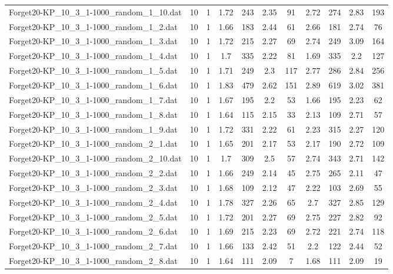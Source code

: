 \begin{table}[!ht]
\begin{tabular}{lcccccccccc}
Forget20-KP\_10\_3\_1-1000\_random\_1\_10.dat & 10 & 1 & 1.72 & 243 & 2.35 & 91 & 2.72 & 274 & 2.83 & 193 \\
Forget20-KP\_10\_3\_1-1000\_random\_1\_2.dat & 10 & 1 & 1.66 & 183 & 2.44 & 61 & 2.66 & 181 & 2.74 & 76 \\
Forget20-KP\_10\_3\_1-1000\_random\_1\_3.dat & 10 & 1 & 1.72 & 215 & 2.27 & 69 & 2.74 & 249 & 3.09 & 164 \\
Forget20-KP\_10\_3\_1-1000\_random\_1\_4.dat & 10 & 1 & 1.7 & 335 & 2.22 & 81 & 1.69 & 335 & 2.2 & 127 \\
Forget20-KP\_10\_3\_1-1000\_random\_1\_5.dat & 10 & 1 & 1.71 & 249 & 2.3 & 117 & 2.77 & 286 & 2.84 & 256 \\
Forget20-KP\_10\_3\_1-1000\_random\_1\_6.dat & 10 & 1 & 1.83 & 479 & 2.62 & 151 & 2.89 & 619 & 3.02 & 381 \\
Forget20-KP\_10\_3\_1-1000\_random\_1\_7.dat & 10 & 1 & 1.67 & 195 & 2.2 & 53 & 1.66 & 195 & 2.23 & 62 \\
Forget20-KP\_10\_3\_1-1000\_random\_1\_8.dat & 10 & 1 & 1.64 & 115 & 2.15 & 33 & 2.13 & 109 & 2.71 & 57 \\
Forget20-KP\_10\_3\_1-1000\_random\_1\_9.dat & 10 & 1 & 1.72 & 331 & 2.22 & 61 & 2.23 & 315 & 2.27 & 120 \\
Forget20-KP\_10\_3\_1-1000\_random\_2\_1.dat & 10 & 1 & 1.65 & 201 & 2.17 & 53 & 2.17 & 190 & 2.72 & 109 \\
Forget20-KP\_10\_3\_1-1000\_random\_2\_10.dat & 10 & 1 & 1.7 & 309 & 2.5 & 57 & 2.74 & 343 & 2.71 & 142 \\
Forget20-KP\_10\_3\_1-1000\_random\_2\_2.dat & 10 & 1 & 1.66 & 249 & 2.14 & 45 & 2.75 & 265 & 2.11 & 47 \\
Forget20-KP\_10\_3\_1-1000\_random\_2\_3.dat & 10 & 1 & 1.68 & 109 & 2.12 & 47 & 2.22 & 103 & 2.69 & 55 \\
Forget20-KP\_10\_3\_1-1000\_random\_2\_4.dat & 10 & 1 & 1.78 & 327 & 2.26 & 65 & 2.7 & 327 & 2.85 & 129 \\
Forget20-KP\_10\_3\_1-1000\_random\_2\_5.dat & 10 & 1 & 1.72 & 201 & 2.27 & 69 & 2.75 & 227 & 2.82 & 92 \\
Forget20-KP\_10\_3\_1-1000\_random\_2\_6.dat & 10 & 1 & 1.69 & 215 & 2.23 & 69 & 2.72 & 221 & 2.74 & 118 \\
Forget20-KP\_10\_3\_1-1000\_random\_2\_7.dat & 10 & 1 & 1.66 & 133 & 2.42 & 51 & 2.2 & 122 & 2.44 & 52 \\
Forget20-KP\_10\_3\_1-1000\_random\_2\_8.dat & 10 & 1 & 1.64 & 111 & 2.09 & 7 & 1.68 & 111 & 2.09 & 19 \\

\end{tabular}
\end{table}
